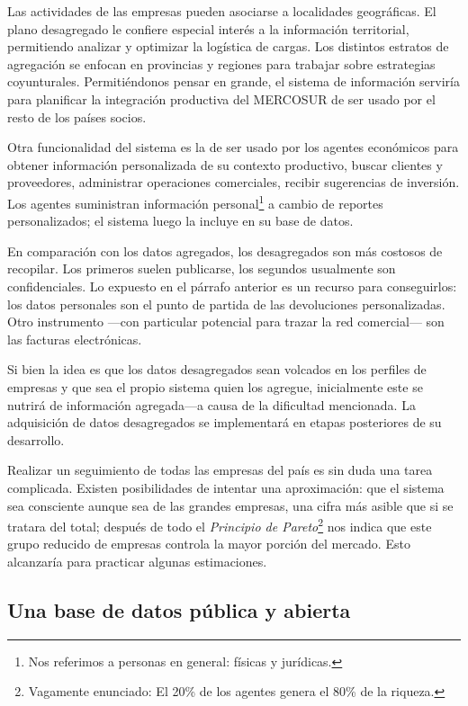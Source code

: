 \documentclass[a4paper]{report}
\begin{document}
Las actividades de las empresas pueden asociarse a localidades geográficas. El plano desagregado le confiere especial interés a la información territorial, permitiendo analizar y optimizar la logística de cargas. Los distintos estratos de agregación se enfocan en provincias y regiones para trabajar sobre estrategias coyunturales. Permitiéndonos pensar en grande, el sistema de información serviría para planificar la integración productiva del MERCOSUR de ser usado por el resto de los países socios.

Otra funcionalidad del sistema es la de ser usado por los agentes económicos para obtener información personalizada de su contexto productivo, buscar clientes y proveedores, administrar operaciones comerciales, recibir sugerencias de inversión. Los agentes suministran información personal\footnote{Nos referimos a personas en general: físicas y jurídicas.} a cambio de reportes personalizados; el sistema luego la incluye en su base de datos.

En comparación con los datos agregados, los desagregados son más costosos de recopilar. Los primeros suelen publicarse, los segundos usualmente son confidenciales. Lo expuesto en el párrafo anterior es un recurso para conseguirlos: los datos personales son el punto de partida de las devoluciones personalizadas. Otro instrumento —con particular potencial para trazar la red comercial— son las facturas electrónicas.

Si bien la idea es que los datos desagregados sean volcados en los perfiles de empresas y que sea el propio sistema quien los agregue, inicialmente este se nutrirá de información agregada—a causa de la dificultad mencionada. La adquisición de datos desagregados se implementará en etapas posteriores de su desarrollo.

Realizar un seguimiento de todas las empresas del país es sin duda una tarea complicada. Existen posibilidades de intentar una aproximación: que el sistema sea consciente aunque sea de las grandes empresas, una cifra más asible que si se tratara del total; después de todo el \textit{Principio de Pareto}\footnote{Vagamente enunciado: El 20\% de los agentes genera el 80\% de la riqueza.} nos indica que este grupo reducido de empresas controla la mayor porción del mercado. Esto alcanzaría para practicar algunas estimaciones.

\subsection*{Una base de datos pública y abierta}
\end{document}
